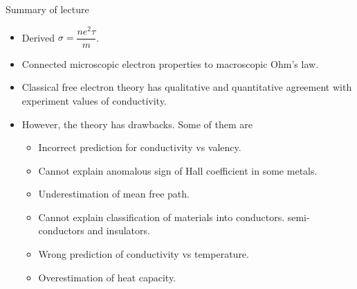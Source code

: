 \begin{frame}{Summary of lecture}
	\begin{itemize}
		\item Derived $\sigma = \dfrac{ne^2\tau}{m}$.
		\item Connected microscopic electron properties to macroscopic Ohm’s law.
		\item Classical free electron theory has qualitative and quantitative agreement with experiment values of conductivity.
		\item However, the theory has drawbacks. Some of them are
		 \begin{itemize}
		 	\item Incorrect prediction for conductivity vs valency.
		 	\item Cannot explain anomalous sign of Hall coefficient in some metals.
		 	\item Underestimation of mean free path.
		 	\item Cannot explain classification of materials into conductors. semi-conductors and insulators.
		 	\item Wrong prediction of conductivity vs temperature.
		 	\item Overestimation of heat capacity.
		 \end{itemize} 
	\end{itemize}
\end{frame}